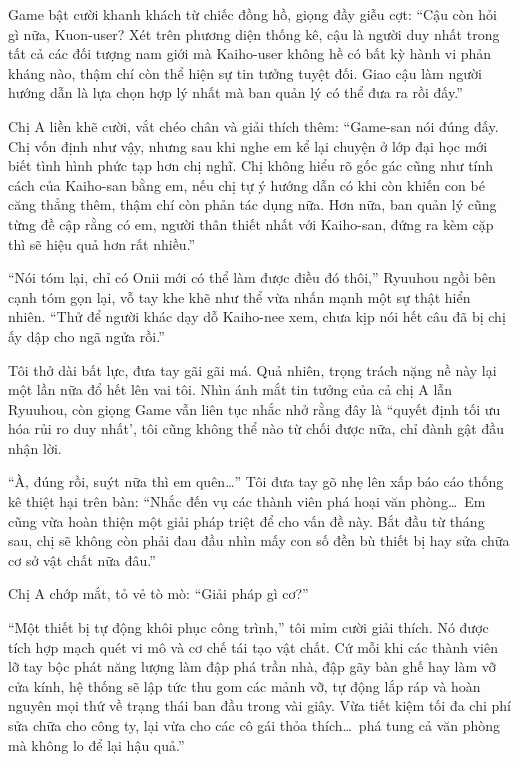 \documentclass[../main.tex]{subfiles}
\begin{document}
Game bật cười khanh khách từ chiếc đồng hồ, giọng đầy giễu cợt: ``Cậu còn hỏi gì nữa, Kuon-user? Xét trên phương diện thống kê, cậu là người duy nhất trong tất cả các đối tượng nam giới mà Kaiho-user không hề có bất kỳ hành vi phản kháng nào, thậm chí còn thể hiện sự tin tưởng tuyệt đối. Giao cậu làm người hướng dẫn là lựa chọn hợp lý nhất mà ban quản lý có thể đưa ra rồi đấy.''

Chị A liền khẽ cười, vắt chéo chân và giải thích thêm: ``Game-san nói đúng đấy. Chị vốn định như vậy, nhưng sau khi nghe em kể lại chuyện ở lớp đại học mới biết tình hình phức tạp hơn chị nghĩ. Chị không hiểu rõ gốc gác cũng như tính cách của Kaiho-san bằng em, nếu chị tự ý hướng dẫn có khi còn khiến con bé căng thẳng thêm, thậm chí còn phản tác dụng nữa. Hơn nữa, ban quản lý cũng từng đề cập rằng có em, người thân thiết nhất với Kaiho-san, đứng ra kèm cặp thì sẽ hiệu quả hơn rất nhiều.''

``Nói tóm lại, chỉ có Onii mới có thể làm được điều đó thôi,'' Ryuuhou ngồi bên cạnh tóm gọn lại, vỗ tay khe khẽ như thể vừa nhấn mạnh một sự thật hiển nhiên. ``Thử để người khác dạy dỗ Kaiho-nee xem, chưa kịp nói hết câu đã bị chị ấy dập cho ngã ngửa rồi.''

Tôi thở dài bất lực, đưa tay gãi gãi má. Quả nhiên, trọng trách nặng nề này lại một lần nữa đổ hết lên vai tôi. Nhìn ánh mắt tin tưởng của cả chị A lẫn Ryuuhou, còn giọng Game vẫn liên tục nhắc nhở rằng đây là ``quyết định tối ưu hóa rủi ro duy nhất', tôi cũng không thể nào từ chối được nữa, chỉ đành gật đầu nhận lời.

\ct

``À, đúng rồi, suýt nữa thì em quên\dots'' Tôi đưa tay gõ nhẹ lên xấp báo cáo thống kê thiệt hại trên bàn: ``Nhắc đến vụ các thành viên phá hoại văn phòng\dots\ Em cũng vừa hoàn thiện một giải pháp triệt để cho vấn đề này. Bắt đầu từ tháng sau, chị sẽ không còn phải đau đầu nhìn mấy con số đền bù thiết bị hay sửa chữa cơ sở vật chất nữa đâu.''

Chị A chớp mắt, tỏ vẻ tò mò: ``Giải pháp gì cơ?''

``Một thiết bị tự động khôi phục công trình,'' tôi mỉm cười giải thích. Nó được tích hợp mạch quét vi mô và cơ chế tái tạo vật chất. Cứ mỗi khi các thành viên lỡ tay bộc phát năng lượng làm đập phá trần nhà, đập gãy bàn ghế hay làm vỡ cửa kính, hệ thống sẽ lập tức thu gom các mảnh vỡ, tự động lắp ráp và hoàn nguyên mọi thứ về trạng thái ban đầu trong vài giây. Vừa tiết kiệm tối đa chi phí sửa chữa cho công ty, lại vừa cho các cô gái thỏa thích\dots\ phá tung cả văn phòng mà không lo để lại hậu quả.''
\end{document}
